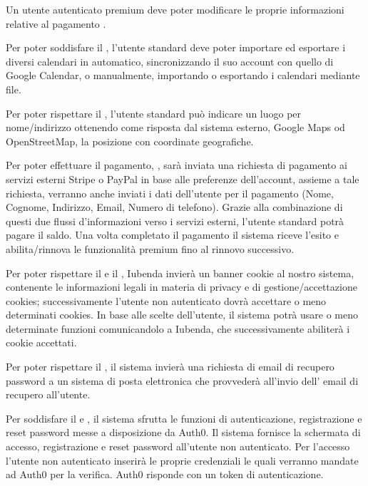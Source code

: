 \begin{listaPersonale}[DCO]{}
    Un utente autenticato premium deve poter modificare le proprie informazioni relative al pagamento .

    Per poter soddisfare il , l'utente standard deve poter importare ed esportare i diversi calendari in automatico, sincronizzando il suo account con quello di Google Calendar, o manualmente, importando o esportando i calendari mediante file.

    Per poter rispettare il , l'utente standard può indicare un luogo per nome/indirizzo ottenendo come risposta dal sistema esterno, Google Maps od OpenStreetMap, la posizione con coordinate geografiche.

    Per poter effettuare il pagamento, , sarà inviata una richiesta di pagamento ai servizi esterni Stripe o PayPal in base alle preferenze dell'account, assieme a tale richiesta, verranno anche inviati i dati dell'utente per il pagamento (Nome, Cognome, Indirizzo, Email, Numero di telefono). Grazie alla combinazione di questi due flussi d'informazioni verso i servizi esterni, l'utente standard potrà pagare il saldo. Una volta completato il pagamento il sistema riceve l'esito e abilita/rinnova le funzionalità premium fino al rinnovo successivo.

    Per poter rispettare il  e il , Iubenda invierà un banner cookie al nostro sistema, contenente le informazioni legali in materia di privacy e di gestione/accettazione cookies; successivamente l'utente non autenticato dovrà accettare o meno determinati cookies. In base alle scelte dell'utente, il sistema potrà usare o meno determinate funzioni comunicandolo a Iubenda, che successivamente abiliterà i cookie accettati.

    Per poter rispettare il , il sistema invierà una richiesta di email di recupero password a un sistema di posta elettronica che provvederà all'invio dell' email di recupero all'utente. %

    Per soddisfare il  e , il sistema sfrutta le funzioni di autenticazione, registrazione e reset password messe a disposizione da Auth0. Il sistema fornisce la schermata di accesso, registrazione e reset password all'utente non autenticato. Per l'accesso l'utente non autenticato inserirà le proprie credenziali le quali verranno mandate ad Auth0 per la verifica. Auth0 risponde con un token di autenticazione.


\end{listaPersonale}
